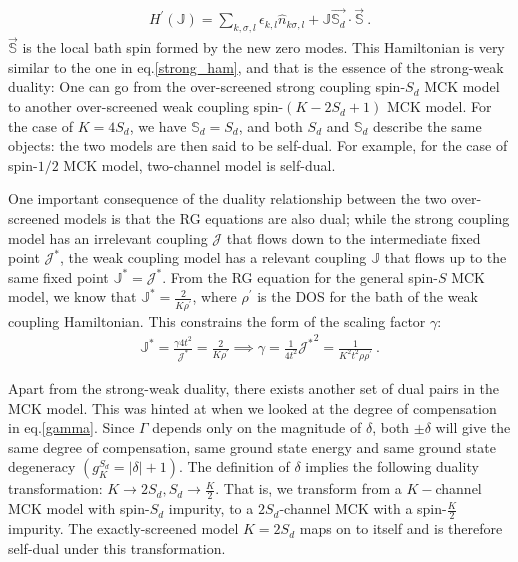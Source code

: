 \documentclass{iopart}
\begin{document}
\begin{eqnarray}
	H^\prime(\mathbb{J}) = \sum_{k,\sigma,l}\epsilon_{k,l} \hat n_{k\sigma,l} + \mathbb{J} \vec{\mathbb{S}_d}\cdot\vec{\mathbb{S}}~.
\end{eqnarray}
$\vec{\mathbb{S}}$ is the local bath spin formed by the new zero modes. This Hamiltonian is very similar to the one in eq.\eqref{strong_ham}, and that is the essence of the strong-weak duality: One can go from the over-screened strong coupling spin-\(S_{d}\) MCK model to another over-screened weak coupling spin-\((K-2S_{d}+1)\) MCK model. For the case of \(K=4S_{d}\), we have \(\mathbb{S}_d = S_d\), and both \(S_d\) and \(\mathbb{S}_d\) describe the same objects: the two models are then said to be self-dual. For example, for the case of spin-$1/2$ MCK model, two-channel model is self-dual.

One important consequence of the duality relationship between the two over-screened models is that the RG equations are also dual; while the strong coupling model has an irrelevant coupling \(\mathcal{J}\) that flows down to the intermediate fixed point \({\mathcal{J}^*}\), the weak coupling model has a relevant coupling \(\mathbb{J}\) that flows up to the same fixed point \({\mathbb{J}}^* = {\mathcal{J}^*}\). From the RG equation for the general spin-\(S\) MCK model, we know that \({\mathbb{J}}^* = \frac{2}{K \rho^\prime}\), where \(\rho^\prime\) is the DOS for the bath of the weak coupling Hamiltonian. This constrains the form of the scaling factor \(\gamma\):
\begin{eqnarray}
	{\mathbb{J}}^* = \frac{\gamma 4t^2}{{\mathcal{J}^*}} = \frac{2}{K \rho^\prime} \implies \gamma = \frac{1}{4t^2} {{\mathcal{J}^*}}^2 = \frac{1}{K^2 t^2 \rho \rho^\prime}~.
\end{eqnarray}

Apart from the strong-weak duality, there exists another set of dual pairs in the MCK model. This was hinted at when we looked at the degree of compensation in eq.\eqref{gamma}. Since \(\Gamma\) depends only on the magnitude of \(\delta\), both \(\pm \delta\) will give the same degree of compensation, same ground state energy and same ground state degeneracy \(\left(g^{S_d}_K = |\delta|+1\right)\). The definition of \(\delta\) implies the following duality transformation: \(K \to 2S_d, S_d \to \frac{K}{2}\). That is, we transform from a \(K-\)channel MCK model with spin-\(S_d\) impurity, to a \(2S_d\)-channel MCK with a spin-\(\frac{K}{2}\) impurity. The exactly-screened model \(K=2S_d\) maps on to itself and is therefore self-dual under this transformation.
\end{document}
